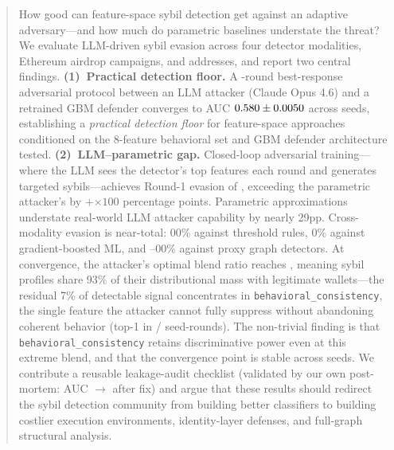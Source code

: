 \documentclass[sigconf,nonacm=false]{acmart}
\begin{document}
\begin{abstract}
How good can feature-space sybil detection get against an adaptive adversary---and how much do parametric baselines understate the threat?
We evaluate LLM-driven sybil evasion across four detector modalities, \largeScaleNProjects{} Ethereum airdrop campaigns, and \largeScaleNAddresses{} addresses, and report two central findings.
\textbf{(1)~Practical detection floor.} A \bestResponseNRounds{}-round best-response adversarial protocol between an LLM attacker (Claude Opus 4.6) and a retrained GBM defender converges to AUC $\bestResponseAucFloorMean{} \pm \bestResponseAucFloorStd{}$ across \bestResponseNSeeds{} seeds, establishing a \emph{practical detection floor} for feature-space approaches conditioned on the 8-feature behavioral set and GBM defender architecture tested.
\textbf{(2)~LLM--parametric gap.} Closed-loop adversarial training---where the LLM sees the detector's top features each round and generates targeted sybils---achieves Round-1 evasion of \closedLoopRoundLlmEvasionMean{}, exceeding the parametric attacker's \closedLoopRoundParametricEvasionMean{} by $+$\closedLoopRoundEvasionDelta{}$\times 100$ percentage points. Parametric approximations understate real-world LLM attacker capability by nearly 29pp.
Cross-modality evasion is near-total: \evasionThresholdRules{}00\% against threshold rules, \evasionLightgbmMl{}0\% against gradient-boosted ML, and \evasionGraphModerate{}--\evasionGraphAdvanced{}00\% against proxy graph detectors.
At convergence, the attacker's optimal blend ratio reaches \bestResponseEquilibriumBlendMean{}, meaning sybil profiles share 93\% of their distributional mass with legitimate wallets---the residual 7\% of detectable signal concentrates in \texttt{behavioral\_consistency}, the single feature the attacker cannot fully suppress without abandoning coherent behavior (top-1 in \behavioralConsistencyTopInNRounds{}/\behavioralConsistencyTopTotalRounds{} seed-rounds).
The non-trivial finding is that \texttt{behavioral\_consistency} retains discriminative power even at this extreme blend, and that the convergence point is stable across seeds.
We contribute a reusable leakage-audit checklist (validated by our own post-mortem: AUC \leakageFixLeakyAuc{}$\to$\leakageFixHonestAuc{} after fix) and argue that these results should redirect the sybil detection community from building better classifiers to building costlier execution environments, identity-layer defenses, and full-graph structural analysis.
\end{abstract}
\end{document}

